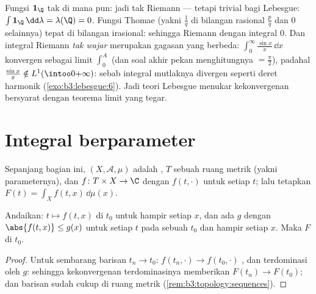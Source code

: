 \begin{example}\label{ex:b3:lebesgue:riemannexamples}
Fungsi $\mathbf 1_\Q$ tak  di mana pun: jadi tak  Riemann
--- tetapi trivial bagi Lebesgue: $\int\mathbf 1_\Q\,\dd\lambda =
\lambda(\Q) = 0$. Fungsi Thomae (yakni $\frac1q$ di bilangan rasional
$\frac pq$ dan $0$ selainnya)  tepat di
bilangan irasional: sehingga  Riemann dengan integral $0$. Dan
integral Riemann \emph{tak wajar} merupakan gagasan yang berbeda:
$\int_0^\infty\frac{\sin x}x\,\dd x$ konvergen sebagai limit
$\int_0^A$ (dan soal akhir pekan menghitungnya $= \frac\pi2$),
padahal $\frac{\sin x}x \notin L^1(\intoo0{+\infty})$: sebab integral
mutlaknya divergen seperti deret harmonik
(\cref{exo:b3:lebesgue:6}). Jadi teori Lebesgue menukar
kekonvergenan bersyarat dengan teorema limit yang tegar.
\end{example}

\section{Integral berparameter}

Sepanjang bagian ini, $(X, \mathcal A, \mu)$ adalah , $T$ sebuah
ruang metrik (yakni parameternya), dan $f \colon T \times X \to \C$
dengan $f(t, \cdot)$  untuk setiap $t$; lalu tetapkan $F(t) = \int_X
f(t, x)\,\dd\mu(x)$.

\begin{theorem}[Kekontinuan]\label{thm:b3:lebesgue:paramcont}
Andaikan: $t \mapsto f(t,x)$  di $t_0$ untuk hampir setiap
$x$, dan ada $g$  dengan $\abs{f(t,x)} \leq
g(x)$ untuk setiap $t$ pada sebuah  $t_0$ dan hampir setiap $x$.
Maka $F$  di $t_0$.
\end{theorem}

\begin{proof}
Untuk sembarang barisan $t_n \to t_0$: $f(t_n, \cdot) \to f(t_0,
\cdot)$ , dan terdominasi oleh $g$: sehingga kekonvergenan terdominasinya memberikan $F(t_n) \to F(t_0)$;
dan  barisan sudah cukup di ruang metrik
(\cref{rem:b3:topology:sequences}).
\end{proof}

